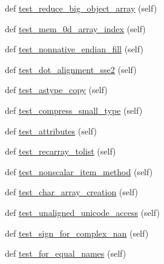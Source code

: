 \begin{DoxyCompactItemize}
\item 
def \hyperlink{classnumpy_1_1core_1_1tests_1_1test__regression_1_1TestRegression_a10f16423d89ccc9cceca66cd0e3bd902}{test\+\_\+reduce\+\_\+big\+\_\+object\+\_\+array} (self)
\item 
def \hyperlink{classnumpy_1_1core_1_1tests_1_1test__regression_1_1TestRegression_a185bccb9c29874d4def7fa9b3ae6bd4f}{test\+\_\+mem\+\_\+0d\+\_\+array\+\_\+index} (self)
\item 
def \hyperlink{classnumpy_1_1core_1_1tests_1_1test__regression_1_1TestRegression_aac0a4d4b816189c55eef06ef3308ee2c}{test\+\_\+nonnative\+\_\+endian\+\_\+fill} (self)
\item 
def \hyperlink{classnumpy_1_1core_1_1tests_1_1test__regression_1_1TestRegression_a104df5309c92b44ef1d8f98e1ef91618}{test\+\_\+dot\+\_\+alignment\+\_\+sse2} (self)
\item 
def \hyperlink{classnumpy_1_1core_1_1tests_1_1test__regression_1_1TestRegression_a2f84c424d91145d6e1185a796fa9ea30}{test\+\_\+astype\+\_\+copy} (self)
\item 
def \hyperlink{classnumpy_1_1core_1_1tests_1_1test__regression_1_1TestRegression_a0f24f319daee18da462855dd4969edb4}{test\+\_\+compress\+\_\+small\+\_\+type} (self)
\item 
def \hyperlink{classnumpy_1_1core_1_1tests_1_1test__regression_1_1TestRegression_a239e29345bdf4ff3db253ed9cfea17aa}{test\+\_\+attributes} (self)
\item 
def \hyperlink{classnumpy_1_1core_1_1tests_1_1test__regression_1_1TestRegression_aa403662cac24715a516001533ba30873}{test\+\_\+recarray\+\_\+tolist} (self)
\item 
def \hyperlink{classnumpy_1_1core_1_1tests_1_1test__regression_1_1TestRegression_a65f729c5b69aa7d735baca020990ec02}{test\+\_\+nonscalar\+\_\+item\+\_\+method} (self)
\item 
def \hyperlink{classnumpy_1_1core_1_1tests_1_1test__regression_1_1TestRegression_a8c5d6a86e83bbf408aa2c6648944e7ff}{test\+\_\+char\+\_\+array\+\_\+creation} (self)
\item 
def \hyperlink{classnumpy_1_1core_1_1tests_1_1test__regression_1_1TestRegression_a6789a71e0cd81d694efc9bf14dbc9d51}{test\+\_\+unaligned\+\_\+unicode\+\_\+access} (self)
\item 
def \hyperlink{classnumpy_1_1core_1_1tests_1_1test__regression_1_1TestRegression_ae95aaeb6b24141bcc0c8e6db939ce3f6}{test\+\_\+sign\+\_\+for\+\_\+complex\+\_\+nan} (self)
\item 
def \hyperlink{classnumpy_1_1core_1_1tests_1_1test__regression_1_1TestRegression_a966212fe3909db4e5cdc5cf1dc1db67c}{test\+\_\+for\+\_\+equal\+\_\+names} (self)

\end{DoxyCompactItemize}
